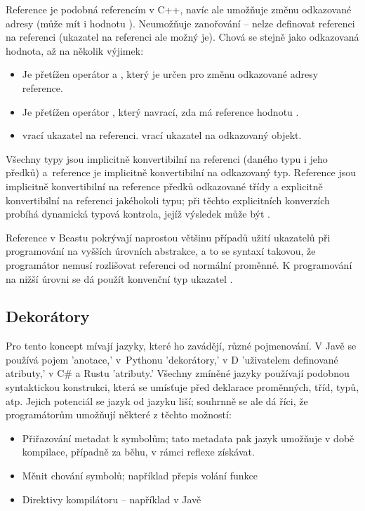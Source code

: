 Reference je podobná referencím v C++, navíc ale umožňuje změnu odkazované adresy (může mít i hodnotu ). Neumožňuje zanořování -- nelze definovat referenci na referenci (ukazatel na referenci ale možný je). Chová se stejně jako odkazovaná hodnota, až na několik výjimek:
\begin{itemize}
	\item Je přetížen operátor  a , který je určen pro změnu odkazované adresy reference.
	\item Je přetížen operátor , který navrací, zda má reference hodnotu .
	\item {} vrací ukazatel na referenci.  vrací ukazatel na odkazovaný objekt.
\end{itemize}

Všechny typy jsou implicitně konvertibilní na referenci (daného typu i jeho předků) a~reference je implicitně konvertibilní na odkazovaný typ. Reference jsou implicitně konvertibilní na reference předků odkazované třídy a explicitně konvertibilní na referenci jakéhokoli typu; při těchto explicitních konverzích probíhá dynamická typová kontrola, jejíž výsledek může být .

Reference v Beastu pokrývají naprostou většinu případů užití ukazatelů při programování na vyšších úrovních abstrakce, a to se syntaxí takovou, že programátor nemusí rozlišovat referenci od normální proměnné. K programování na nižší úrovni se dá použít konvenční typ ukazatel .

\subsection{Dekorátory} \label{decorators}
Pro tento koncept mívají jazyky, které ho zavádějí, různé pojmenování. V Javě se používá pojem 'anotace,' v~Pythonu 'dekorátory,' v D 'uživatelem definované atributy,' v C\# a Rustu 'atributy.' Všechny zmíněné jazyky používají podobnou syntaktickou konstrukci, která se umísťuje před deklarace proměnných, tříd, typů, atp. Jejich potenciál se jazyk od jazyku liší; souhrnně se ale dá říci, že programátorům umožňují některé z těchto možností:
\begin{itemize}
	\item Přiřazování metadat k symbolům; tato metadata pak jazyk umožňuje v době kompilace, případně za běhu, v rámci reflexe získávat.
	\item Měnit chování symbolů; například přepis volání funkce
	\item Direktivy kompilátoru -- například  v Javě
\end{itemize}

